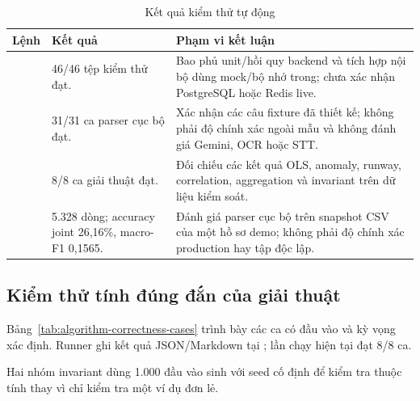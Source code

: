 \begin{table}[H]
  \centering
  \caption{Kết quả kiểm thử tự động}
  \label{tab:automated-test-results}
  \begin{tabularx}{\textwidth}{@{}L{3.3cm}L{2.8cm}Y@{}}
    \toprule
    \textbf{Lệnh} & \textbf{Kết quả} & \textbf{Phạm vi kết luận} \\
    \midrule
     & 46/46 tệp kiểm thử đạt. & Bao phủ unit/hồi quy backend và tích hợp nội bộ dùng mock/bộ nhớ trong; chưa xác nhận PostgreSQL hoặc Redis live. \\
     & 31/31 ca parser cục bộ đạt. & Xác nhận các câu fixture đã thiết kế; không phải độ chính xác ngoài mẫu và không đánh giá Gemini, OCR hoặc STT. \\
     & 8/8 ca giải thuật đạt. & Đối chiếu các kết quả OLS, anomaly, runway, correlation, aggregation và invariant trên dữ liệu kiểm soát. \\
     & 5.328 dòng; accuracy joint 26,16\%, macro-F1 0,1565. & Đánh giá parser cục bộ trên snapshot CSV của một hồ sơ demo; không phải độ chính xác production hay tập độc lập. \\
    \bottomrule
  \end{tabularx}
\end{table}

\subsection{Kiểm thử tính đúng đắn của giải thuật}

Bảng~\ref{tab:algorithm-correctness-cases} trình bày các ca có đầu vào và kỳ vọng xác định. Runner ghi kết quả JSON/Markdown tại ; lần chạy hiện tại đạt 8/8 ca.

Hai nhóm invariant dùng 1.000 đầu vào sinh với seed cố định để kiểm tra thuộc tính thay vì chỉ kiểm tra một ví dụ đơn lẻ.

